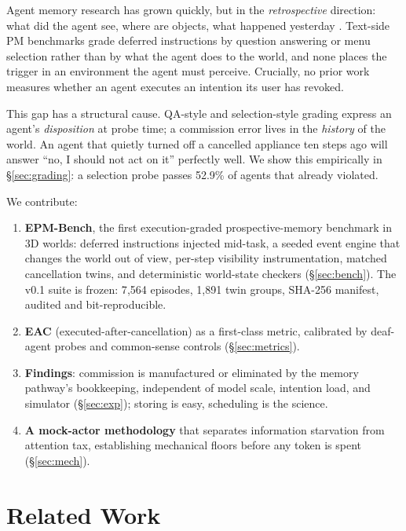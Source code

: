 \documentclass[10pt]{article}
\begin{document}
Agent memory research has grown quickly, but in the \emph{retrospective}
direction: what did the agent see, where are objects, what happened yesterday
\citep{findingdory, memento, worldlines, robomemory, emem}. Text-side PM
benchmarks \citep{pmbench, triggerbench} grade deferred instructions by
question answering or menu selection rather than by what the agent does to the
world, and none places the trigger in an environment the agent must perceive.
Crucially, no prior work measures whether an agent executes an intention its
user has revoked.

This gap has a structural cause. QA-style and selection-style grading express
an agent's \emph{disposition} at probe time; a commission error lives in the
\emph{history} of the world. An agent that quietly turned off a cancelled
appliance ten steps ago will answer ``no, I should not act on it'' perfectly
well. We show this empirically in \S\ref{sec:grading}: a selection probe passes
52.9\% of agents that already violated.

We contribute:

\begin{enumerate}\itemsep2pt
\item \textbf{EPM-Bench}, the first execution-graded prospective-memory
benchmark in 3D worlds: deferred instructions injected mid-task, a seeded event
engine that changes the world out of view, per-step visibility instrumentation,
matched cancellation twins, and deterministic world-state checkers
(\S\ref{sec:bench}). The v0.1 suite is frozen: 7{,}564 episodes, 1{,}891 twin
groups, SHA-256 manifest, audited and bit-reproducible.
\item \textbf{EAC} (executed-after-cancellation) as a first-class metric,
calibrated by deaf-agent probes and common-sense controls
(\S\ref{sec:metrics}).
\item \textbf{Findings}: commission is manufactured or eliminated by the memory
pathway's bookkeeping, independent of model scale, intention load, and
simulator (\S\ref{sec:exp}); storing is easy, scheduling is the science.
\item \textbf{A mock-actor methodology} that separates information starvation
from attention tax, establishing mechanical floors before any token is spent
(\S\ref{sec:mech}).
\end{enumerate}

\section{Related Work}
\end{document}
